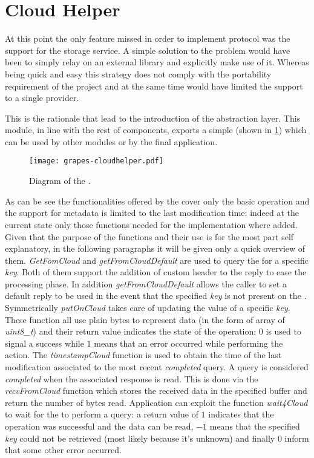 \section{Cloud Helper}
At this point the only feature \grapes missed in order to implement
\cloudcast \peersampling protocol was the support for the storage
service. A simple solution to the problem would have been to simply
relay on an external library and explicitly make use of it. Whereas
being quick and easy this strategy does not comply with the
portability requirement of the project and at the same time would have
limited the \cloud support to a single provider.

This is the rationale that lead to the introduction of the
\cloudhelper abstraction layer. This module, in line with the rest of
\grapes components, exports a simple \api (shown in
\ref{fig:grapes-cloudhelper}) which can be used by other
modules or by the final application.

\begin{figure}[H]
  \centering
  \texttt{[image: grapes-cloudhelper.pdf]}
  \caption{Diagram of the \cloudhelper \api.}
  \label{fig:grapes-cloudhelper}
\end{figure}

As can be see the functionalities offered by the \api cover only the
basic \cloud operation and the support for metadata is limited to the
last modification time: indeed at the current state only those
functions needed for the \cloudcast implementation where
added.
Given that the purpose of the functions and their use is for the most
part self explanatory, in the following paragraphs it will be given
only a quick overview of them.
\emph{GetFomCloud} and \emph{getFromCloudDefault} are used to
query the \cloud for a specific \textit{key}. Both of them support the
addition of custom header to the reply to ease the processing
phase. In addition \emph{getFromCloudDefault} allows the caller to
set a default reply to be used in the event that the specified
\textit{key} is not present on the \cloud. Symmetrically
\emph{putOnCloud} takes care of updating the value of a specific
\textit{key}. These function all use plain bytes to represent
data (in the form of array of \textit{uint8\_t}) and their return
value indicates the state of the operation: $0$ is used to signal a
success while $1$ means that an error occurred while performing the
action. The \emph{timestampCloud} function is used to obtain the time
of the last modification associated to the most recent
\textit{completed} query. A query is considered \textit{completed}
when the associated response is read. This is done via the
\emph{recvFromCloud} function which stores the received data in the
specified buffer and return the number of bytes read. Application can
exploit the function \emph{wait4Cloud} to wait for the \cloud to
perform a query: a return value of $1$ indicates that the
operation was successful and the data can be read, $-1$ means that the
specified \textit{key} could not be retrieved (most likely because it's
unknown) and finally $0$ inform that some other error occurred.

